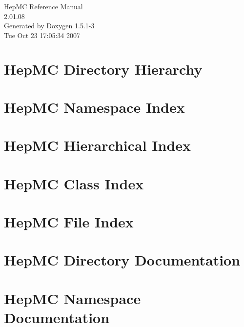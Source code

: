 \documentclass[a4paper]{book}
\begin{document}
\begin{titlepage}
\vspace*{7cm}
\begin{center}
{\Large Hep\-MC Reference Manual\\[1ex]\large 2.01.08 }\\
\vspace*{1cm}
{\large Generated by Doxygen 1.5.1-3}\\
\vspace*{0.5cm}
{\small Tue Oct 23 17:05:34 2007}\\
\end{center}
\end{titlepage}
\clearemptydoublepage
{}
\tableofcontents
\clearemptydoublepage
{}
\chapter{Hep\-MC Directory Hierarchy}

\chapter{Hep\-MC Namespace Index}

\chapter{Hep\-MC Hierarchical Index}

\chapter{Hep\-MC Class Index}

\chapter{Hep\-MC File Index}

\chapter{Hep\-MC Directory Documentation}





\chapter{Hep\-MC Namespace Documentation}




\end{document}
